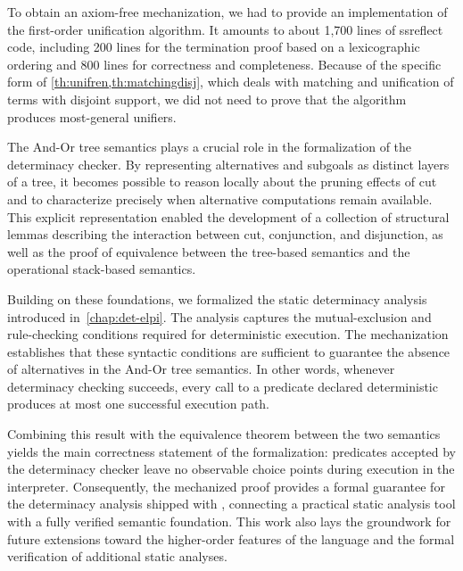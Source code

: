 To obtain an axiom-free mechanization, we had to provide an implementation of
the first-order unification algorithm. It amounts to about 1,700 lines of
ssreflect code, including 200 lines for the termination proof based on a
lexicographic ordering and 800 lines for correctness and completeness. Because
of the specific form of \cref{th:unifren,th:matchingdisj}, which deals with
matching and unification of terms with disjoint support, we did not need to
prove that the algorithm produces most-general unifiers.

The And-Or tree semantics plays a crucial role in the formalization of the
determinacy checker. By representing alternatives and subgoals as distinct
layers of a tree, it becomes possible to reason locally about the pruning
effects of cut and to characterize precisely when alternative computations
remain available. This explicit representation enabled the development of a
collection of structural lemmas describing the interaction between cut,
conjunction, and disjunction, as well as the proof of equivalence between the
tree-based semantics and the operational stack-based semantics.

Building on these foundations, we formalized the static determinacy analysis
introduced in~\cref{chap:det-elpi}. The analysis captures 
the mutual-exclusion and
rule-checking conditions required for deterministic execution. The mechanization
establishes that these syntactic conditions are sufficient to guarantee the
absence of alternatives in the And-Or tree semantics. In other words,
whenever determinacy checking succeeds, every call to a predicate declared
deterministic produces at most one successful execution path.

Combining this result with the equivalence theorem between the two semantics
yields the main correctness statement of the formalization: predicates accepted
by the determinacy checker leave no observable choice points during execution in
the \elpi interpreter. Consequently, the mechanized proof provides a formal
guarantee for the determinacy analysis shipped with \elpi, connecting
a practical static analysis tool with a fully verified semantic foundation. This
work also lays the groundwork for future extensions toward the higher-order
features of the language and the formal verification of additional static
analyses.